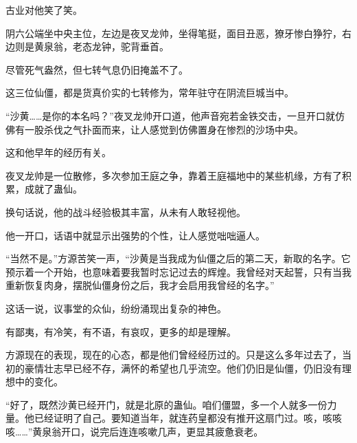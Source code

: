 \begin{this_body}
古业对他笑了笑。

阴六公端坐中央主位，左边是夜叉龙帅，坐得笔挺，面目丑恶，獠牙惨白狰狞，右边则是黄泉翁，老态龙钟，驼背垂首。

尽管死气盎然，但七转气息仍旧掩盖不了。

这三位仙僵，都是货真价实的七转修为，常年驻守在阴流巨城当中。

“沙黄……是你的本名吗？”夜叉龙帅开口道，他声音宛若金铁交击，一旦开口就仿佛有一股杀伐之气扑面而来，让人感觉到仿佛置身在惨烈的沙场中央。

这和他早年的经历有关。

夜叉龙帅是一位散修，多次参加王庭之争，靠着王庭福地中的某些机缘，方有了积累，成就了蛊仙。

换句话说，他的战斗经验极其丰富，从未有人敢轻视他。

他一开口，话语中就显示出强势的个性，让人感觉咄咄逼人。

“当然不是。”方源苦笑一声，“沙黄是当我成为仙僵之后的第二天，新取的名字。它预示着一个开始，也意味着要我暂时忘记过去的辉煌。我曾经对天起誓，只有当我重新恢复肉身，摆脱仙僵身份之后，我才会启用我曾经的名字。”

这话一说，议事堂的众仙，纷纷涌现出复杂的神色。

有鄙夷，有冷笑，有不语，有哀叹，更多的却是理解。

方源现在的表现，现在的心态，都是他们曾经经历过的。只是这么多年过去了，当初的豪情壮志早已经不存，满怀的希望也几乎流空。他们仍旧是仙僵，仍旧没有理想中的变化。

“好了，既然沙黄已经开门，就是北原的蛊仙。咱们僵盟，多一个人就多一份力量。他已经证明了自己。要知道当年，就连药皇都没有推开这扇门过。咳，咳咳咳……”黄泉翁开口，说完后连连咳嗽几声，更显其疲惫衰老。

\end{this_body}

